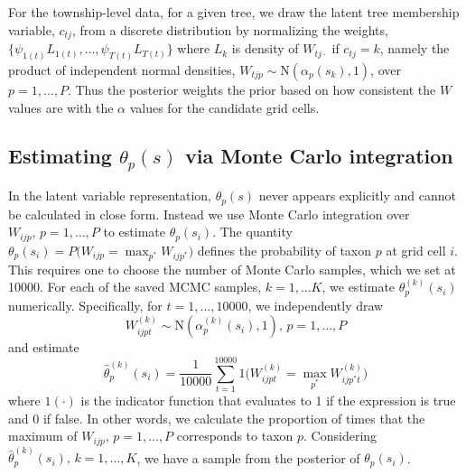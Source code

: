 \documentclass[12pt]{article}\usepackage[]{graphicx}\usepackage[]{color}
\begin{document}
\noindent 

For the township-level data, for a given tree, we draw the latent
tree membership variable, $c_{tj}$, from a discrete distribution
by normalizing the weights, $\{\psi_{1(t)}L_{1(t)},\ldots,\psi_{T(t)}L_{T(t)}\}$
where $L_{k}$ is density of $W_{tj\cdot}$ if $c_{tj}=k$, namely
the product of independent normal densities, $W_{tjp}\sim\mbox{N}(\alpha_{p}(s_{k}),1)$,
over $p=1,\ldots,P$. Thus the posterior weights the prior based on
how consistent the $W$ values are with the $\alpha$ values for the
candidate grid cells. 




\subsection{Estimating $\theta_{p}(s)$ via Monte Carlo integration}

In the latent variable representation, $\theta_{p}(s)$ never appears
explicitly and cannot be calculated in close form. Instead we use
Monte Carlo integration over $W_{ijp},\, p=1,\ldots,P$ to estimate
$\theta_{p}(s_{i})$. The quantity $\theta_{p}(s_{i})=P(W_{ijp}={\displaystyle \max_{p^{*}}W_{ijp^{*}})}$
defines the probability of taxon $p$ at grid cell $i$. This requires
one to choose the number of Monte Carlo samples, which we set at 10000.
For each of the saved MCMC samples, $k=1,\ldots K$, we estimate $\theta_{p}^{(k)}(s_{i})$
numerically. Specifically, for $t=1,\ldots,10000$, we independently
draw
\[
W_{ijpt}^{(k)}\sim\mbox{N}(\alpha_{p}^{(k)}(s_{i}),1),\, p=1,\ldots,P
\]
and estimate 
\[
\hat{\theta}_{p}^{(k)}(s_{i})=\frac{1}{10000}{\displaystyle \sum_{t=1}^{10000}1(W_{ijpt}^{(k)}={\displaystyle \max_{p^{*}}W_{ijp^{*}t}^{(k)})}}
\]
where $1(\cdot)$ is the indicator function that evaluates to 1 if
the expression is true and 0 if false. In other words, we calculate
the proportion of times that the maximum of $W_{ijp},\, p=1,\ldots,P$
corresponds to taxon $p$. Considering $\hat{\theta}_{p}^{(k)}(s_{i}),\, k=1,\ldots,K$,
we have a sample from the posterior of $\theta_{p}(s_{i})$.
\end{document}
